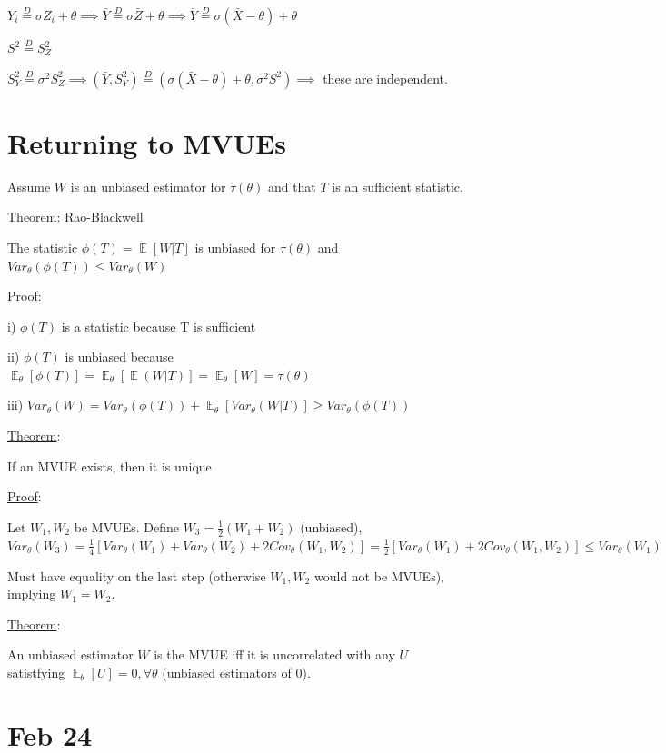 \documentclass{article}
\DeclareMathOperator{\EX}{\mathbb{E}} %
\begin{document}
$Y_i \overset{D}{=} \sigma Z_i + \theta \implies \bar{Y} \overset{D}{=} \sigma \bar{Z} + \theta \implies \bar{Y} \overset{D}{=} \sigma(\bar{X} - \theta) + \theta$

$S^2 \overset{D}{=} S_Z^2$

$S_Y^2 \overset{D}{=} \sigma^2 S_Z^2 \implies (\bar{Y}, S_Y^2) \overset{D}{=} (\sigma(\bar{X} - \theta) + \theta, \sigma^2 S^2) \implies$ these are independent. 


\section{Returning to MVUEs}

Assume $W$ is an unbiased estimator for $\tau(\theta)$ and that $T$ is an sufficient statistic. 


\underline{Theorem}: Rao-Blackwell

The statistic $\phi(T) = \EX[W|T]$ is unbiased for $\tau(\theta)$ and $Var_{\theta}(\phi(T)) \le Var_{\theta}(W)$

\underline{Proof}:

i) $\phi(T)$ is a statistic because T is sufficient

ii) $\phi(T)$ is unbiased because $\EX_{\theta}[\phi(T)] = \EX_{\theta}[\EX(W|T)] = \EX_{\theta}[W] = \tau(\theta)$

iii) $Var_{\theta}(W) = Var_{\theta}(\phi(T)) + \EX_{\theta}[Var_{\theta}(W|T)] \ge Var_{\theta}(\phi(T))$

\underline{Theorem}:

If an MVUE exists, then it is unique

\underline{Proof}: 

Let $W_1, W_2$ be MVUEs. Define $W_3 = \frac{1}{2}(W_1 + W_2)$ (unbiased), $Var_{\theta}(W_3) = \frac{1}{4}[Var_{\theta}(W_1) + Var_{\theta}(W_2) + 2 Cov_{\theta}(W_1, W_2)] = \frac{1}{2}[Var_{\theta}(W_1) + 2 Cov_{\theta}(W_1, W_2)] \le Var_{\theta}(W_1)$

Must have equality on the last step (otherwise $W_1, W_2$ would not be MVUEs), implying $W_1 = W_2$.

\underline{Theorem}: 

An unbiased estimator $W$ is the MVUE iff it is uncorrelated with any $U$ satistfying $\EX_{\theta}[U] = 0, \forall \theta$ (unbiased estimators of 0).


\section{Feb 24}
\end{document}
